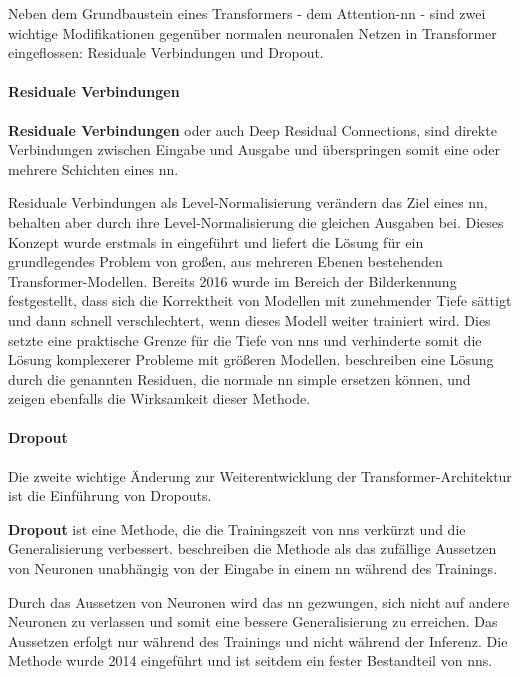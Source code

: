 Neben dem Grundbaustein eines Transformers - dem Attention-\ac{nn} - sind zwei wichtige Modifikationen gegenüber normalen neuronalen Netzen in Transformer eingeflossen: Residuale Verbindungen und Dropout.\\
\paragraph{Residuale Verbindungen}
\begin{definition}\label{def:residuale-verbindungen}
    \textbf{Residuale Verbindungen} oder auch Deep Residual Connections, sind direkte Verbindungen zwischen Eingabe und Ausgabe und überspringen somit eine oder mehrere Schichten eines \ac{nn}.
\end{definition}
Residuale Verbindungen als Level-Normalisierung verändern das Ziel eines \ac{nn}, behalten aber durch ihre Level-Normalisierung die gleichen Ausgaben bei.
Dieses Konzept wurde erstmals in \citet{deep_residual} eingeführt und liefert die Lösung für ein grundlegendes Problem von großen, aus mehreren Ebenen bestehenden Transformer-Modellen.
Bereits 2016 wurde im Bereich der Bilderkennung festgestellt, dass sich die Korrektheit von Modellen mit zunehmender Tiefe sättigt und dann schnell verschlechtert, wenn dieses Modell weiter trainiert wird.
Dies setzte eine praktische Grenze für die Tiefe von \ac{nn}s und verhinderte somit die Lösung komplexerer Probleme mit größeren Modellen.
\citet{deep_residual} beschreiben eine Lösung durch die genannten Residuen, die normale \ac{nn} simple ersetzen können, und zeigen ebenfalls die Wirksamkeit dieser Methode.\\

\paragraph{Dropout}
Die zweite wichtige Änderung zur Weiterentwicklung der Transformer-Architektur ist die Einführung von Dropouts.
\begin{definition}\label{def:dropout}
    \textbf{Dropout} ist eine Methode, die die Trainingszeit von \ac{nn}s verkürzt und die Generalisierung verbessert.
    \citet{dropout} beschreiben die Methode als das zufällige Aussetzen von Neuronen unabhängig von der Eingabe in einem \ac{nn} während des Trainings. 
\end{definition}
Durch das Aussetzen von Neuronen wird das \ac{nn} gezwungen, sich nicht auf andere Neuronen zu verlassen und somit eine bessere Generalisierung zu erreichen.
Das Aussetzen erfolgt nur während des Trainings und nicht während der Inferenz.
Die Methode wurde 2014 eingeführt und ist seitdem ein fester Bestandteil von \ac{nn}s.\\

